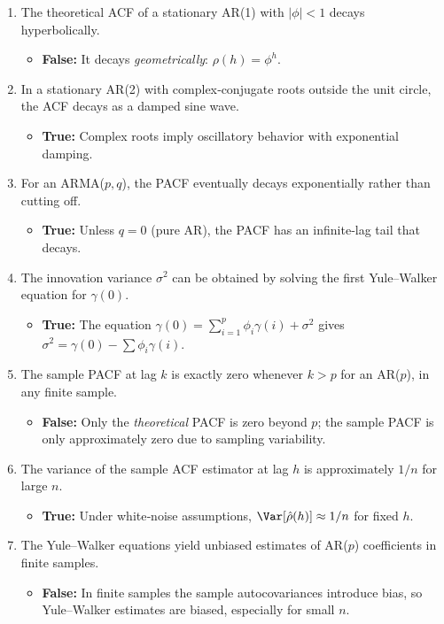 \documentclass[11pt]{article}
\begin{document}
\begin{enumerate}
  \item The theoretical ACF of a stationary AR(1) with $|\phi|<1$ decays hyperbolically.
  \begin{itemize}
    \item \textbf{False:}  It decays \emph{geometrically}: $\rho(h)=\phi^h$.
  \end{itemize}

  \item In a stationary AR(2) with complex‐conjugate roots outside the unit circle, the ACF decays as a damped sine wave.
  \begin{itemize}
    \item \textbf{True:}  Complex roots imply oscillatory behavior with exponential damping.
  \end{itemize}

  \item For an ARMA($p,q$), the PACF eventually decays exponentially rather than cutting off.
  \begin{itemize}
    \item \textbf{True:}  Unless $q=0$ (pure AR), the PACF has an infinite‐lag tail that decays.
  \end{itemize}

  \item The innovation variance $\sigma^2$ can be obtained by solving the first Yule–Walker equation for $\gamma(0)$.
  \begin{itemize}
    \item \textbf{True:}  The equation $\gamma(0)=\sum_{i=1}^p\phi_i\gamma(i)+\sigma^2$ gives $\sigma^2=\gamma(0)-\sum\phi_i\gamma(i)$.
  \end{itemize}

  \item The sample PACF at lag $k$ is exactly zero whenever $k>p$ for an AR($p$), in any finite sample.
  \begin{itemize}
    \item \textbf{False:}  Only the \emph{theoretical} PACF is zero beyond $p$; the sample PACF is only approximately zero due to sampling variability.
  \end{itemize}

  \item The variance of the sample ACF estimator at lag $h$ is approximately $1/n$ for large $n$.
  \begin{itemize}
    \item \textbf{True:}  Under white‐noise assumptions, $\Var[\hat\rho(h)]\approx1/n$ for fixed $h$.
  \end{itemize}
    \item The Yule–Walker equations yield unbiased estimates of AR($p$) coefficients in finite samples.
  \begin{itemize}
    \item \textbf{False:} In finite samples the sample autocovariances introduce bias, so Yule–Walker estimates are biased, especially for small $n$.
  \end{itemize}


\end{enumerate}
\end{document}
